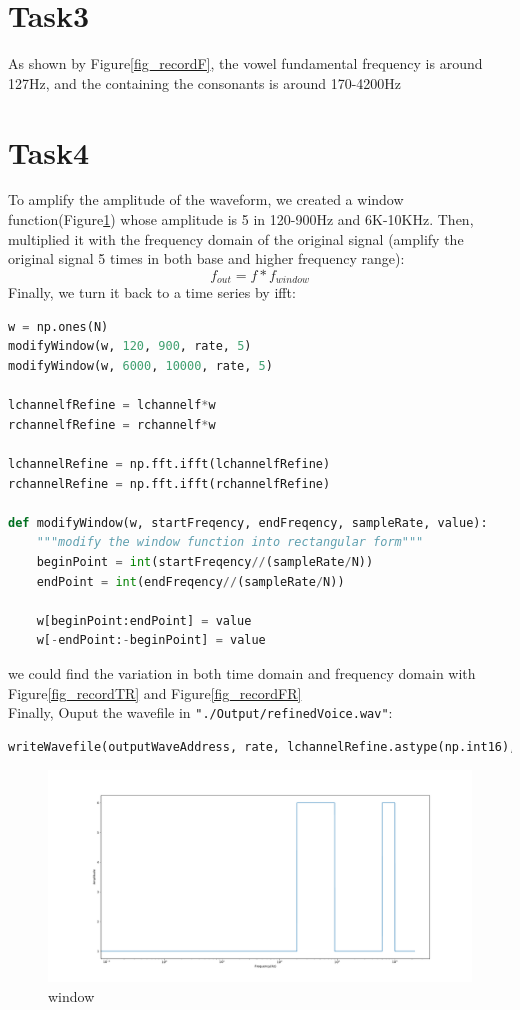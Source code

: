 \documentclass[a4paper,12pt]{article}
\begin{document}
\section{Task3}
As shown by Figure\ref{fig_recordF}, the vowel fundamental frequency is around 127Hz, and the containing the consonants is around  170-4200Hz
\section{Task4}
To amplify the amplitude of the waveform,  we created a window function(Figure\ref{fig_window}) whose amplitude is 5 in 120-900Hz and 6K-10KHz. Then,  multiplied it with the frequency domain of the original signal (amplify the original signal 5 times in both base and higher frequency range):
$$f_{out}=f*f_{window}$$
Finally, we turn it back to a time series by ifft:
\begin{lstlisting}[language=Python]
w = np.ones(N)
modifyWindow(w, 120, 900, rate, 5)
modifyWindow(w, 6000, 10000, rate, 5)

lchannelfRefine = lchannelf*w
rchannelfRefine = rchannelf*w

lchannelRefine = np.fft.ifft(lchannelfRefine)
rchannelRefine = np.fft.ifft(rchannelfRefine)

def modifyWindow(w, startFreqency, endFreqency, sampleRate, value):
	"""modify the window function into rectangular form"""
	beginPoint = int(startFreqency//(sampleRate/N))
	endPoint = int(endFreqency//(sampleRate/N))
	
	w[beginPoint:endPoint] = value
	w[-endPoint:-beginPoint] = value
\end{lstlisting}
we could find the variation in both time domain and frequency domain with Figure\ref{fig_recordTR} and Figure\ref{fig_recordFR}\\
Finally, Ouput the wavefile in \lstinline{"./Output/refinedVoice.wav"}:
\begin{lstlisting}[language=Python]
writeWavefile(outputWaveAddress, rate, lchannelRefine.astype(np.int16), rchannelRefine.astype(np.int16))
\end{lstlisting}
\begin{figure}[h]   
	\centering 
	\includegraphics[width=12cm]{../Output/Figures/window.pdf} 
	\caption{window}   
	\label{fig_window}
\end{figure}
\end{document}
